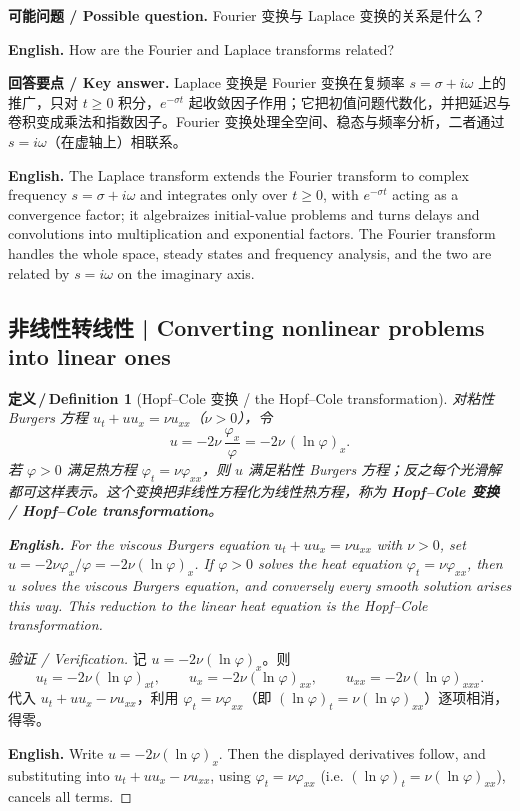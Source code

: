 \documentclass[UTF8,11pt,a4paper]{ctexart}
\newcommand{\EN}[1]{\par\noindent \textbf{English.} #1\par}
\newcommand{\ASK}[4]{\par\noindent \textbf{可能问题 / Possible question.} #1\par\EN{#2}\noindent \textbf{回答要点 / Key answer.} #3\par\EN{#4}\medskip}
\newtheorem{definition}{定义\,/\,Definition}[section]
\begin{document}
\ASK{Fourier 变换与 Laplace 变换的关系是什么？}{How are the Fourier and Laplace transforms related?}{Laplace 变换是 Fourier 变换在复频率 $s=\sigma+i\omega$ 上的推广，只对 $t\ge0$ 积分，$e^{-\sigma t}$ 起收敛因子作用；它把初值问题代数化，并把延迟与卷积变成乘法和指数因子。Fourier 变换处理全空间、稳态与频率分析，二者通过 $s=i\omega$（在虚轴上）相联系。}{The Laplace transform extends the Fourier transform to complex frequency $s=\sigma+i\omega$ and integrates only over $t\ge0$, with $e^{-\sigma t}$ acting as a convergence factor; it algebraizes initial-value problems and turns delays and convolutions into multiplication and exponential factors. The Fourier transform handles the whole space, steady states and frequency analysis, and the two are related by $s=i\omega$ on the imaginary axis.}

\subsection{非线性转线性 | Converting nonlinear problems into linear ones}
\begin{definition}[Hopf--Cole 变换 / the Hopf--Cole transformation]\label{def:hopfcole}
对粘性 Burgers 方程 $u_t+uu_x=\nu u_{xx}$（$\nu>0$），令
\[
u=-2\nu\,\frac{\varphi_x}{\varphi}=-2\nu\,(\ln\varphi)_x .
\]
若 $\varphi>0$ 满足热方程 $\varphi_t=\nu\varphi_{xx}$，则 $u$ 满足粘性 Burgers 方程；反之每个光滑解都可这样表示。这个变换把非线性方程化为线性热方程，称为 \textbf{Hopf--Cole 变换 / Hopf--Cole transformation}。
\EN{For the viscous Burgers equation $u_t+uu_x=\nu u_{xx}$ with $\nu>0$, set $u=-2\nu\varphi_x/\varphi=-2\nu(\ln\varphi)_x$. If $\varphi>0$ solves the heat equation $\varphi_t=\nu\varphi_{xx}$, then $u$ solves the viscous Burgers equation, and conversely every smooth solution arises this way. This reduction to the linear heat equation is the Hopf--Cole transformation.}
\end{definition}

\begin{proof}[验证 / Verification]
记 $u=-2\nu(\ln\varphi)_x$。则
\[
u_t=-2\nu(\ln\varphi)_{xt},\qquad
u_x=-2\nu(\ln\varphi)_{xx},\qquad
u_{xx}=-2\nu(\ln\varphi)_{xxx}.
\]
代入 $u_t+uu_x-\nu u_{xx}$，利用 $\varphi_t=\nu\varphi_{xx}$（即 $(\ln\varphi)_t=\nu(\ln\varphi)_{xx}$）逐项相消，得零。\EN{Write $u=-2\nu(\ln\varphi)_x$. Then the displayed derivatives follow, and substituting into $u_t+uu_x-\nu u_{xx}$, using $\varphi_t=\nu\varphi_{xx}$ (i.e. $(\ln\varphi)_t=\nu(\ln\varphi)_{xx}$), cancels all terms.}
\end{proof}
\end{document}
